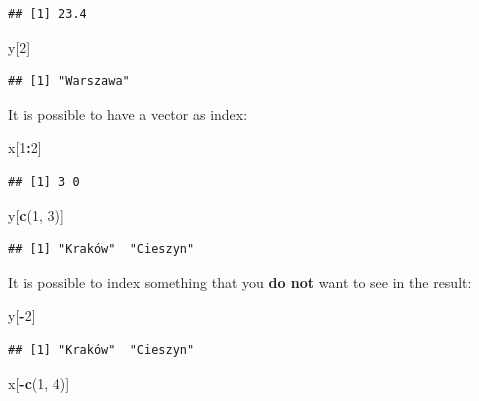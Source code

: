 \documentclass[
]{book}
\newenvironment{Shaded}{\begin{snugshade}}{\end{snugshade}}
\newcommand{\DecValTok}[1]{\textcolor[rgb]{0.00,0.00,0.81}{#1}}
\newcommand{\KeywordTok}[1]{\textcolor[rgb]{0.13,0.29,0.53}{\textbf{#1}}}
\newcommand{\NormalTok}[1]{#1}
\newcommand{\OperatorTok}[1]{\textcolor[rgb]{0.81,0.36,0.00}{\textbf{#1}}}
\begin{document}
\begin{verbatim}
## [1] 23.4
\end{verbatim}

\begin{Shaded}
\begin{Highlighting}[]
\NormalTok{y[}\DecValTok{2}\NormalTok{]}
\end{Highlighting}
\end{Shaded}

\begin{verbatim}
## [1] "Warszawa"
\end{verbatim}

It is possible to have a vector as index:

\begin{Shaded}
\begin{Highlighting}[]
\NormalTok{x[}\DecValTok{1}\OperatorTok{:}\DecValTok{2}\NormalTok{]}
\end{Highlighting}
\end{Shaded}

\begin{verbatim}
## [1] 3 0
\end{verbatim}

\begin{Shaded}
\begin{Highlighting}[]
\NormalTok{y[}\KeywordTok{c}\NormalTok{(}\DecValTok{1}\NormalTok{, }\DecValTok{3}\NormalTok{)]}
\end{Highlighting}
\end{Shaded}

\begin{verbatim}
## [1] "Kraków"  "Cieszyn"
\end{verbatim}

It is possible to index something that you \textbf{do not} want to see in the result:

\begin{Shaded}
\begin{Highlighting}[]
\NormalTok{y[}\OperatorTok{-}\DecValTok{2}\NormalTok{]}
\end{Highlighting}
\end{Shaded}

\begin{verbatim}
## [1] "Kraków"  "Cieszyn"
\end{verbatim}

\begin{Shaded}
\begin{Highlighting}[]
\NormalTok{x[}\OperatorTok{-}\KeywordTok{c}\NormalTok{(}\DecValTok{1}\NormalTok{, }\DecValTok{4}\NormalTok{)]}
\end{Highlighting}
\end{Shaded}
\end{document}
